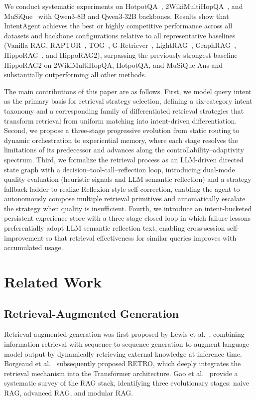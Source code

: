 \documentclass[runningheads]{llncs}
\begin{document}
We conduct systematic experiments on HotpotQA~\cite{ref20}, 2WikiMultiHopQA~\cite{ref21}, and MuSiQue~\cite{ref22} with Qwen3-8B and Qwen3-32B backbones. Results show that IntentAgent achieves the best or highly competitive performance across all datasets and backbone configurations relative to all representative baselines (Vanilla RAG, RAPTOR~\cite{ref23}, TOG~\cite{ref24}, G-Retriever~\cite{ref25}, LightRAG~\cite{ref26}, GraphRAG~\cite{ref27}, HippoRAG~\cite{ref28}, and HippoRAG2), surpassing the previously strongest baseline HippoRAG2 on 2WikiMultiHopQA, HotpotQA, and MuSiQue-Ans and substantially outperforming all other methods.

The main contributions of this paper are as follows. First, we model query intent as the primary basis for retrieval strategy selection, defining a six-category intent taxonomy and a corresponding family of differentiated retrieval strategies that transform retrieval from uniform matching into intent-driven differentiation. Second, we propose a three-stage progressive evolution from static routing to dynamic orchestration to experiential memory, where each stage resolves the limitations of its predecessor and advances along the controllability--adaptivity spectrum. Third, we formalize the retrieval process as an LLM-driven directed state graph with a decision--tool-call--reflection loop, introducing dual-mode quality evaluation (heuristic signals and LLM semantic reflection) and a strategy fallback ladder to realize Reflexion-style self-correction, enabling the agent to autonomously compose multiple retrieval primitives and automatically escalate the strategy when quality is insufficient. Fourth, we introduce an intent-bucketed persistent experience store with a three-stage closed loop in which failure lessons preferentially adopt LLM semantic reflection text, enabling cross-session self-improvement so that retrieval effectiveness for similar queries improves with accumulated usage.

\section{Related Work}

\subsection{Retrieval-Augmented Generation}

Retrieval-augmented generation was first proposed by Lewis et al.~\cite{ref1}, combining information retrieval with sequence-to-sequence generation to augment language model output by dynamically retrieving external knowledge at inference time. Borgeaud et al.~\cite{ref3} subsequently proposed RETRO, which deeply integrates the retrieval mechanism into the Transformer architecture. Gao et al.~\cite{ref2} provide a systematic survey of the RAG stack, identifying three evolutionary stages: naive RAG, advanced RAG, and modular RAG.
\end{document}
